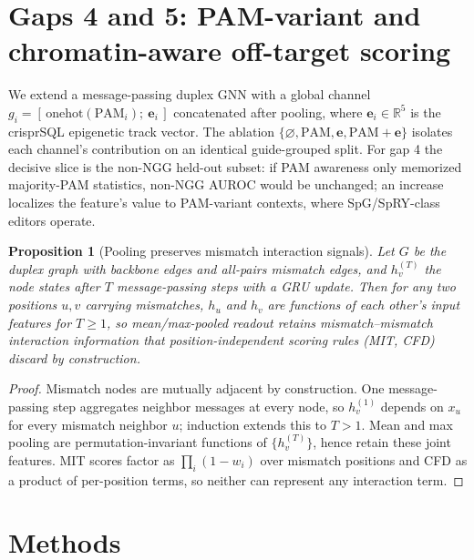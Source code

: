 \documentclass[12pt]{article}
\newtheorem{proposition}{Proposition}
\begin{document}
\section{Gaps 4 and 5: PAM-variant and chromatin-aware off-target scoring}
We extend a message-passing duplex GNN with a global channel
$g_i = [\,\mathrm{onehot}(\mathrm{PAM}_i);\ \mathbf{e}_i\,]$ concatenated
after pooling, where $\mathbf{e}_i\in\mathbb{R}^5$ is the crisprSQL
epigenetic track vector. The ablation
$\{\varnothing, \mathrm{PAM}, \mathbf{e}, \mathrm{PAM}{+}\mathbf{e}\}$
isolates each channel's contribution on an identical guide-grouped split.
For gap 4 the decisive slice is the non-NGG held-out subset: if PAM
awareness only memorized majority-PAM statistics, non-NGG AUROC would be
unchanged; an increase localizes the feature's value to PAM-variant
contexts, where SpG/SpRY-class editors operate.
\begin{proposition}[Pooling preserves mismatch interaction signals]
Let $G$ be the duplex graph with backbone edges and all-pairs mismatch
edges, and $h_v^{(T)}$ the node states after $T$ message-passing steps with
a GRU update. Then for any two positions $u,v$ carrying mismatches, $h_u$
and $h_v$ are functions of each other's input features for $T\ge 1$, so
mean/max-pooled readout retains mismatch--mismatch interaction information
that position-independent scoring rules (MIT, CFD) discard by construction.
\end{proposition}
\begin{proof}
Mismatch nodes are mutually adjacent by construction. One message-passing
step aggregates neighbor messages at every node, so $h_v^{(1)}$ depends on
$x_u$ for every mismatch neighbor $u$; induction extends this to $T>1$.
Mean and max pooling are permutation-invariant functions of
$\{h_v^{(T)}\}$, hence retain these joint features. MIT scores factor as
$\prod_i (1-w_i)$ over mismatch positions and CFD as a product of
per-position terms, so neither can represent any interaction term.
\end{proof}

\section{Methods}
\end{document}
